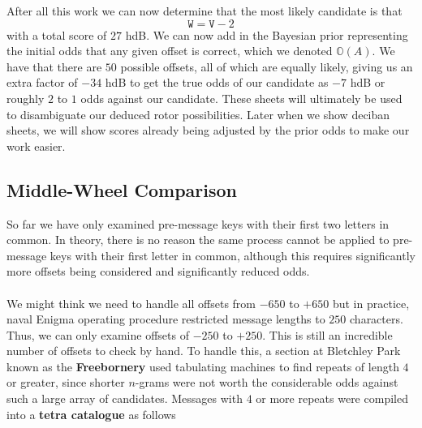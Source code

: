 \noindent After all this work we can now determine that the most
likely candidate is that
\[
	\texttt{W} = \texttt{V} - 2
\]
with a total score of $27$ hdB. We can now add in the Bayesian
prior representing the initial odds that any given offset is
correct, which we denoted $\mathbb{O}(A)$. We have that there are
$50$ possible offsets, all of which are equally likely, giving us
an extra factor of $-34$ hdB to get the true odds of our candidate
as $-7$ hdB or roughly $2$ to $1$ odds against our candidate. These sheets will ultimately be used to disambiguate our deduced rotor possibilities. Later when we show deciban sheets, we will show scores already being adjusted by the prior odds to make our work easier.

\subsection{Middle-Wheel Comparison}
So far we have only examined pre-message keys with their first two
letters in common. In theory, there is no reason the same process
cannot be applied to pre-message keys with their first letter in
common, although this requires significantly more offsets being
considered and significantly reduced odds.
\\\\We might think we need to handle all offsets from $-650$ to $+650$ but in practice, naval Enigma operating procedure restricted message lengths to $250$ characters. Thus, we can only examine offsets of $-250$ to $+250$. This is still an incredible number of offsets to check by hand. To handle this, a section at Bletchley Park known as the {\bf{Freebornery}} used tabulating machines to find repeats of length $4$ or greater, since shorter $n$-grams were not worth the considerable odds against such a large array of candidates. Messages with $4$ or more repeats were compiled into a {\bf{tetra catalogue}} as follows

